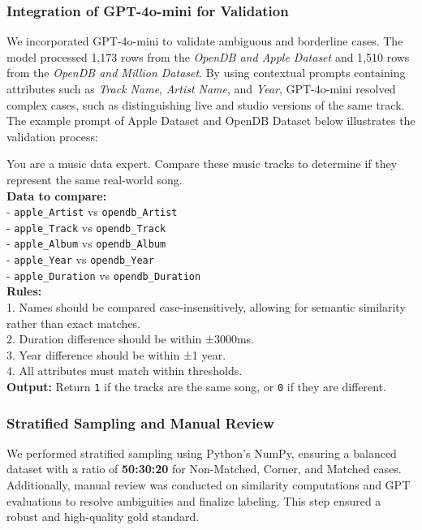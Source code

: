 \documentclass[runningheads]{llncs}
\begin{document}
\subsubsection*{Integration of GPT-4o-mini for Validation}
We incorporated GPT-4o-mini to validate ambiguous and borderline cases. The model processed 1,173 rows from the \textit{OpenDB and Apple Dataset} and 1,510 rows from the \textit{OpenDB and Million Dataset}. By using contextual prompts containing attributes such as \textit{Track Name}, \textit{Artist Name}, and \textit{Year}, GPT-4o-mini resolved complex cases, such as distinguishing live and studio versions of the same track. The example prompt of Apple Dataset and OpenDB Dataset below illustrates the validation process:	
\begin{tcolorbox}[colback=gray!5!white, colframe=black!75!white, title=Prompt]
	You are a music data expert. Compare these music tracks to determine if they represent the same real-world song. \\
	
	\textbf{Data to compare:} \\
	- \texttt{apple\_Artist} vs \texttt{opendb\_Artist} \\
	- \texttt{apple\_Track} vs \texttt{opendb\_Track} \\
	- \texttt{apple\_Album} vs \texttt{opendb\_Album} \\
	- \texttt{apple\_Year} vs \texttt{opendb\_Year} \\
	- \texttt{apple\_Duration} vs \texttt{opendb\_Duration} \\
	
	\textbf{Rules:} \\
	1. Names should be compared case-insensitively, allowing for semantic similarity rather than exact matches. \\
	2. Duration difference should be within ±3000ms. \\
	3. Year difference should be within ±1 year. \\
	4. All attributes must match within thresholds. \\
	
	\textbf{Output:} Return \texttt{1} if the tracks are the same song, or \texttt{0} if they are different.
	\end{tcolorbox}
	
		
\subsubsection*{Stratified Sampling and Manual Review}
We performed stratified sampling using Python's NumPy, ensuring a balanced dataset with a ratio of \textbf{50:30:20} for Non-Matched, Corner, and Matched cases. Additionally, manual review was conducted on similarity computations and GPT evaluations to resolve ambiguities and finalize labeling. This step ensured a robust and high-quality gold standard.
\end{document}
